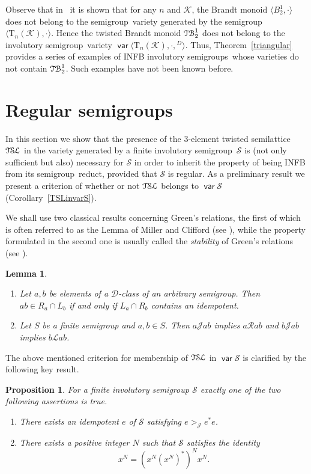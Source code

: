\documentclass[11pt,reqno]{amsart}
\def\Rc{\mathrel{\mathscr{R}}}
\def\Lc{\mathrel{\mathscr{L}}}
\def\Jc{\mathrel{\mathscr{J}}}
\newcommand{\sgp}{semi\-group}
\newcommand{\is}{involutory semi\-group}
\newcommand{\iss}{involutory semi\-groups}
\newcommand{\fis}{finite involutory semi\-group}
\newcommand{\TSL}{\ensuremath{\mathcal{T\kern-.5pt S\kern-.5pt L}}}
\newcommand{\TB}{\ensuremath{\mathcal{T\kern-.5pt B}_2^1}}
\newtheorem{Prop}[Thm]{Proposition}
\newtheorem{Lemma}[Thm]{Lemma}
\DeclareMathOperator{\var}{\mathsf{var}}
\begin{document}
Observe that in~\cite{Goldberg&Volkov:2003} it is shown that for any $n$ and $\mathcal{K}$, the Brandt monoid $\langle B_2^1,\cdot\rangle$
does not belong to the \sgp\ variety generated by the \sgp\ $\langle\mathrm{T}_n(\mathcal{K}),\cdot\rangle$. Hence the twisted Brandt
monoid $\TB$ does not belong to the \is\ variety $\var\langle\mathrm{T}_n(\mathcal{K}),\cdot,{}^D\rangle$. Thus, Theorem~\ref{triangular}
provides a series of examples of INFB \iss\ whose varieties do not contain $\TB$. Such examples have not been known before.

\section{Regular semigroups}
\label{sec:regular}

In this section we show that the presence of the 3-element twisted semilattice $\TSL$ in the variety generated by a \fis\ $\mathcal{S}$ is
(not only sufficient but also) necessary for $\mathcal{S}$ in order to inherit the property of being INFB  from its \sgp\ reduct, provided
that $\mathcal{S}$ is regular. As a preliminary result we present a criterion of whether or not $\TSL$ belongs to $\var\mathcal{S}$
(Corollary~\ref{TSLinvarS}).


We shall use two classical results concerning Green's relations, the first of which is often referred
to as the Lemma of Miller and Clifford (see \cite[Proposition~2.3.7]{how}), while the property formulated
in the second one is usually called the \emph{stability} of Green's relations (see \cite[Proposition~3.1.4 (2)]{pin}).

\begin{Lemma} \label{Miller&Clifford}
\begin{enumerate}
\item Let $a,b$ be elements of a $\mathscr{D}$-class of an arbitrary \sgp. Then $ab\in R_a\cap L_b$ if and only if
$L_a\cap R_b$ contains an idempotent.
\item Let $S$ be a finite semigroup and $a,b\in S$. Then $a\Jc ab$ implies $a\Rc ab$ and $b\Jc ab$ implies $b \Lc ab$.
\end{enumerate}
\end{Lemma}

The above mentioned criterion for membership of $\TSL$ in $\var\mathcal{S}$ is clarified by the following key result.
\begin{Prop}\label{alternative} For a finite involutory semigroup $\mathcal{S}$ exactly one of the two following assertions is true.
\begin{enumerate}
\item[(A)] There exists an idempotent $e$ of $\mathcal{S}$ satisfying $e\mathrel{{>}_{\!\!\!\Jc}} e^*e$.
\item[(B)] There exists a positive integer $N$ such that  $\mathcal{S}$ satisfies the identity
\begin{equation}\label{identityfor(B)}
x^N=(x^N(x^N)^*)^Nx^N.
\end{equation}
\end{enumerate}
\end{Prop}
\end{document}
